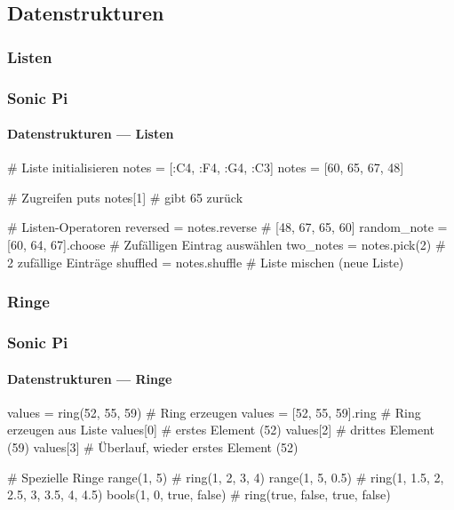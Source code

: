 \documentclass{beamer}
\begin{document}
\subsection{Datenstrukturen}
\subsubsection{Listen}
\begin{frame}[fragile]
  \frametitle{Sonic Pi}
  \framesubtitle{Datenstrukturen --- Listen}

  \begin{rubycode}
    # Liste initialisieren
    notes = [:C4, :F4, :G4, :C3]
    notes = [60, 65, 67, 48]

    # Zugreifen
    puts notes[1] # gibt 65 zurück

    # Listen-Operatoren
    reversed = notes.reverse          # [48, 67, 65, 60]
    random_note = [60, 64, 67].choose # Zufälligen Eintrag auswählen
    two_notes = notes.pick(2)         # 2 zufällige Einträge
    shuffled = notes.shuffle          # Liste mischen (neue Liste)

  \end{rubycode}
\end{frame}

\subsubsection{Ringe}
\begin{frame}[fragile]
  \frametitle{Sonic Pi}
  \framesubtitle{Datenstrukturen --- Ringe}

  \begin{rubycode}
    values = ring(52, 55, 59)   # Ring erzeugen
    values = [52, 55, 59].ring  # Ring erzeugen aus Liste
    values[0]                   # erstes Element (52)
    values[2]                   # drittes Element (59)
    values[3]                   # Überlauf, wieder erstes Element (52)

    # Spezielle Ringe
    range(1, 5)              # ring(1, 2, 3, 4)
    range(1, 5, 0.5)         # ring(1, 1.5, 2, 2.5, 3, 3.5, 4, 4.5)
    bools(1, 0, true, false) # ring(true, false, true, false)
  \end{rubycode}
\end{frame}
\end{document}
